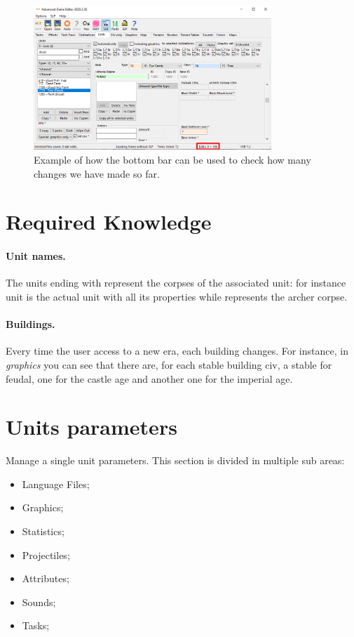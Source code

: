 \begin{appendices}
    \begin{figure}[ht]
        \centering
        \includegraphics[width=0.8\textwidth]{src/images/bottom-bar}
        \caption{Example of how the bottom bar can be used to check how many changes we have made so far.}
        \label{fig:bottombar}
    \end{figure}

    \section{Required Knowledge}

    \paragraph{Unit names.}
    The units ending with  represent the corpses of the associated unit: for instance  unit is the actual unit with all its properties while  represents the archer corpse.

    \paragraph{Buildings.} Every time the user access to a new era, each building changes. For instance, in \textit{graphics} you can see that there are, for each stable building civ, a stable for feudal, one for the castle age and another one for the imperial age.

    \section{Units parameters}

    Manage a single unit parameters. This section is divided in multiple sub areas:

    \begin{itemize}
        \item Language Files;
        \item Graphics;
        \item Statistics;
        \item Projectiles;
        \item Attributes;
        \item Sounds;
        \item Tasks;
    \end{itemize}


\end{appendices}
